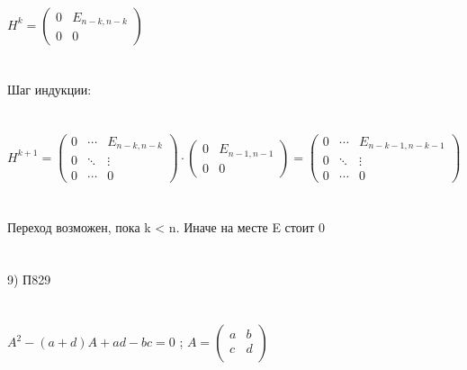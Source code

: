 \documentclass[12pt, a4paper]{article}
\begin{document}
	  \\\\\\
	  \begin{math}
	  	H  ^ k = 
	  	\left(
	  	\begin{array}{rr}
	  		0 & E_{n - k, n - k}\\
	  		0 & 0
	  	\end{array} 
	  	\right )
	  \end{math}
	  \\\\\\
	  Шаг индукции:
	  \\\\\\
	  \begin{math}
	  	H  ^ {k + 1} = 
	  	\left(
	  	\begin{array}{lll}
	  		0 & \cdots & E_{n - k, n - k}\\
	  		0 & \ddots &  \vdots \\
	  		0 & \cdots & 0
	  	\end{array} 
	  	\right )
	  	\cdot 
	  	\left(
	  	\begin{array}{rr}
	  		0 & E_{n - 1, n - 1}\\
	  		0 & 0
	  	\end{array} 
	  	\right )
	  	=
	  	\left(
	  	\begin{array}{lll}
	  		0 & \cdots & E_{n - k - 1, n - k - 1}\\
	  		0 & \ddots &  \vdots \\
	  		0 & \cdots & 0
	  	\end{array} 
	  	\right )
	  \end{math}
	  \\\\\\
	  Переход возможен, пока k < n. Иначе на месте E стоит 0
	  \\\\\\
	  9) П829
	  \\\\\\
	  $A^2 - (a + d)A + ad - bc = 0$
	  ; 
	   \begin{math}
	   	A = 
	   	\left(
	   	\begin{array}{rr}
	   		a  & b \\
	   		c & d \\
	   	\end{array}
	   	\right )
	   \end{math}
\end{document}
